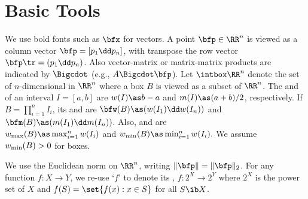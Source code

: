 	




%	
%
%	
%
\section{Basic Tools}
	We use bold fonts such as $\bfx$ for vectors.
	A point $\bfp\in \RR^n$ is viewed
	as a column vector $\bfp=[p_1\dd p_n]$,
	with transpose the row vector $\bfp\tr =(p_1\dd p_n)$.
	Also vector-matrix or matrix-matrix
	products are indicated by $\Bigcdot$ (e.g., $A\Bigcdot \bfp$).
	Let $\intbox\RR^n$ denote the set of $n$-dimensional  in
	$\RR^n$ where a box $B$ is viewed as a subset of $\RR^n$. 
	The  and  of
	an interval $I = [a, b]$ are $w(I) \as b - a$ and $m(I)
	\as (a + b) / 2$, respectively.
	If $B = \prod_{i=1}^n I_i$, its  and  are
		$\bfw(B) \as (w(I_1)\dd w(I_n))$ and
		$\bfm(B) \as (m(I_1) \dd m(I_n))$.
	Also,  and  are \\
	$\wmax(B)\as \max_{i=1}^n w(I_i)$ and
	$\wmin(B)\as \min_{i=1}^n w(I_i).$
	We assume $w_{\min}(B)>0$ for boxes.
	
	We use the Euclidean norm on $\RR^n$, writing 
	$\|\bfp\|=\|\bfp\|_2$.
	For any function $f: X \to Y$, we
	re-use `$f$' to denote its ,
	$f:2^X\to 2^Y$ where $2^X$ is the power set of $X$ and
	$f(S)=\set{f(x): x\in S}$ for all $S\ib X$.


